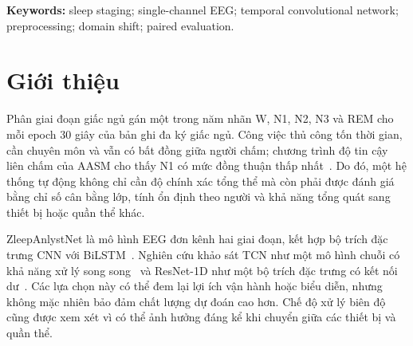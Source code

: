 \documentclass[10pt,a4paper]{article}
\begin{document}
\renewcommand{\abstractname}{Abstract}
\begin{abstract}
We evaluated six single-channel EEG sleep-staging configurations under shared subject partitions on 78 Sleep-EDF Expanded participants and assessed transfer to SHHS1. The comparisons distinguished sequence-model configurations, feature/context packages and preprocessing, with their training settings reported explicitly. The fixed-scale ResNet-1D--TCN configuration E3 achieved the highest seed-42 out-of-fold macro-F1 (0.7904), exceeding E6 by 0.0213 (95\% CI $[0.0122,0.0307]$, Holm-adjusted $p=0.0012$). The seed-123 sensitivity run retained a positive pooled difference but not Holm significance in the subject-level Wilcoxon analysis. E6 estimates normalization statistics from each complete unlabelled target recording and therefore has a transductive dependency. E3 provided a 3.76-fold inference speed-up over E0 in the benchmark, at the cost of 4.37 times more parameters and 28.4\% higher peak GPU memory. On 180 locked SHHS1 participants, E3 exceeded E0 and E6 in subject-mean macro-F1. Nevertheless, E0 and E3 each misclassified more than 72\% of N3 epochs as N2, with N3 recall of 0.2610 and 0.2582; E6 did not remedy this deficit. The results quantify pipeline-level performance and operational trade-offs while identifying a recurring N3 transfer error, without establishing an architecture-only advantage or a validated adaptation remedy.
\end{abstract}
\noindent\textbf{Keywords:} sleep staging; single-channel EEG; temporal convolutional network; preprocessing; domain shift; paired evaluation.

\section{Giới thiệu}

Phân giai đoạn giấc ngủ gán một trong năm nhãn W, N1, N2, N3 và REM cho mỗi epoch 30 giây của bản ghi đa ký giấc ngủ. Công việc thủ công tốn thời gian, cần chuyên môn và vẫn có bất đồng giữa người chấm; chương trình độ tin cậy liên chấm của AASM cho thấy N1 có mức đồng thuận thấp nhất~\cite{rosenberg2013aasm}. Do đó, một hệ thống tự động không chỉ cần độ chính xác tổng thể mà còn phải được đánh giá bằng chỉ số cân bằng lớp, tính ổn định theo người và khả năng tổng quát sang thiết bị hoặc quần thể khác.

ZleepAnlystNet là mô hình EEG đơn kênh hai giai đoạn, kết hợp bộ trích đặc trưng CNN với BiLSTM~\cite{jadhav2024zleepanlystnet}. Nghiên cứu khảo sát TCN như một mô hình chuỗi có khả năng xử lý song song~\cite{bai2018tcn} và ResNet-1D như một bộ trích đặc trưng có kết nối dư~\cite{he2016resnet}. Các lựa chọn này có thể đem lại lợi ích vận hành hoặc biểu diễn, nhưng không mặc nhiên bảo đảm chất lượng dự đoán cao hơn. Chế độ xử lý biên độ cũng được xem xét vì có thể ảnh hưởng đáng kể khi chuyển giữa các thiết bị và quần thể.
\end{document}
